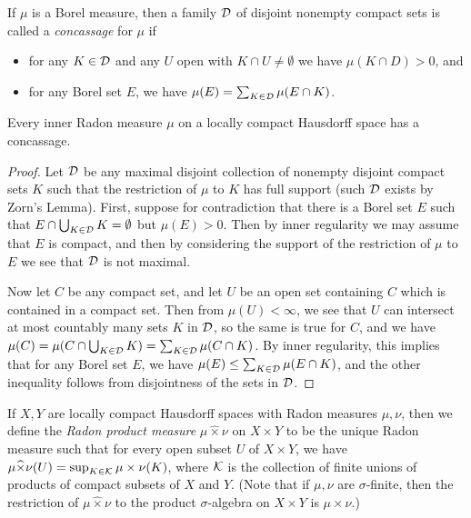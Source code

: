 \documentclass[letterpaper,11pt]{report}
\begin{document}
\begin{defn} If $\mu$ is a Borel measure, then a family $\mathcal{D}$ of disjoint nonempty compact sets is called a \emph{concassage} for $\mu$ if
\begin{itemize}
\item for any $K \in \mathcal{D}$ and any $U$ open with $K \cap U \ne \emptyset$ we have $\mu(K \cap D) > 0$, and

\item for any Borel set $E$, we have $\mu(E) = \sum_{K \in \mathcal{D}} \mu(E \cap K)$.
\end{itemize}
\end{defn}

\begin{prop} Every inner Radon measure $\mu$ on a locally compact Hausdorff space has a concassage.
\end{prop}
\begin{proof} Let $\mathcal{D}$ be any maximal disjoint collection of nonempty disjoint compact sets $K$ such that the restriction of $\mu$ to $K$ has full support (such $\mathcal{D}$ exists by Zorn's Lemma). First, suppose for contradiction that there is a Borel set $E$ such that $E \cap \bigcup_{K \in \mathcal{D}} K = \emptyset$ but $\mu(E) > 0$. Then by inner regularity we may assume that $E$ is compact, and then by considering the support of the restriction of $\mu$ to $E$ we see that $\mathcal{D}$ is not maximal.

Now let $C$ be any compact set, and let $U$ be an open set containing $C$ which is contained in a compact set. Then from $\mu(U) < \infty$, we see that $U$ can intersect at most countably many sets $K$ in $\mathcal{D}$, so the same is true for $C$, and we have $\mu(C) = \mu(C \cap \bigcup_{K \in \mathcal{D}} K) = \sum_{K \in \mathcal{D}} \mu(C \cap K)$. By inner regularity, this implies that for any Borel set $E$, we have $\mu(E) \le \sum_{K \in \mathcal{D}} \mu(E \cap K)$, and the other inequality follows from disjointness of the sets in $\mathcal{D}$.
\end{proof}

\begin{defn} If $X,Y$ are locally compact Hausdorff spaces with Radon measures $\mu,\nu$, then we define the \emph{Radon product measure} $\mu\widehat{\times}\nu$ on $X\times Y$ to be the unique Radon measure such that for every open subset $U$ of $X\times Y$, we have $\mu\widehat{\times}\nu(U) = \sup_{K \in \mathcal{K}} \mu\times\nu(K)$, where $\mathcal{K}$ is the collection of finite unions of products of compact subsets of $X$ and $Y$. (Note that if $\mu, \nu$ are $\sigma$-finite, then the restriction of $\mu\widehat{\times}\nu$ to the product $\sigma$-algebra on $X\times Y$ is $\mu\times\nu$.)
\end{defn}
\end{document}
